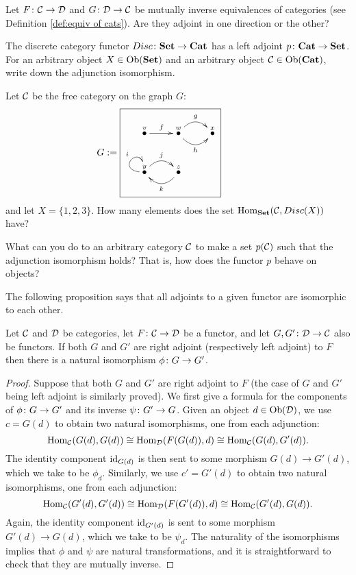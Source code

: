 \documentclass[CT4S-EN-RU]{subfiles}
\begin{document}
\begin{exercise}
Let $F\colon\mathcal{C}\rightarrow\mathcal{D}$ and $G\colon\mathcal{D}\rightarrow\mathcal{C}$ be mutually inverse equivalences of categories (see Definition \ref{def:equiv of cats}). Are they adjoint in one direction or the other?
\end{exercise}

\begin{exercise}
The discrete category functor $Disc\colon{\bf Set}\rightarrow{\bf Cat}$ has a left adjoint $p\colon{\bf Cat}\rightarrow{\bf Set}$. 
\sexc For an arbitrary object $X\in\textnormal{Ob}({\bf Set})$ and an arbitrary object $\mathcal{C}\in\textnormal{Ob}({\bf Cat})$, write down the adjunction isomorphism.
\item Let $\mathcal{C}$ be the free category on the graph $G$:
$$
G:=\parbox{2in}{\fbox{\xymatrix{\LMO{v}\ar[r]^f&\LMO{w}\ar@/_1pc/[r]_h\ar@/^1pc/[r]^g&\LMO{x}\\\LMO{y}\ar@(l,u)[]^i\ar@/^1pc/[r]^j&\LMO{z}\ar@/^1pc/[l]^k}}}
$$
and let $X=\{1,2,3\}$. How many elements does the set $\textnormal{Hom}_{\bf Set}(\mathcal{C},Disc(X))$ have?
\item What can you do to an arbitrary category $\mathcal{C}$ to make a set $p(\mathcal{C})$ such that the adjunction isomorphism holds? That is, how does the functor $p$ behave on objects?
\endsexc
\end{exercise}

The following proposition says that all adjoints to a given functor are isomorphic to each other. 

\begin{proposition}\label{prop:unicity of adjoints}

Let $\mathcal{C}$ and $\mathcal{D}$ be categories, let $F\colon\mathcal{C}\rightarrow\mathcal{D}$ be a functor, and let $G,G'\colon\mathcal{D}\rightarrow\mathcal{C}$ also be functors. If both $G$ and $G'$ are right adjoint (respectively left adjoint) to $F$ then there is a natural isomorphism $\phi\colon G\rightarrow G'$.

\end{proposition}

\begin{proof}

Suppose that both $G$ and $G'$ are right adjoint to $F$ (the case of $G$ and $G'$ being left adjoint is similarly proved). We first give a formula for the components of $\phi\colon G\rightarrow G'$ and its inverse $\psi\colon G'\rightarrow G$. Given an object $d\in\textnormal{Ob}(\mathcal{D})$, we use $c=G(d)$ to obtain two natural isomorphisms, one from each adjunction: 
$$\textnormal{Hom}_\mathcal{C}(G(d),G(d))\cong\textnormal{Hom}_\mathcal{D}(F(G(d)),d)\cong\textnormal{Hom}_\mathcal{C}(G(d),G'(d)).$$
The identity component $\textnormal{id}_{G(d)}$ is then sent to some morphism $G(d)\to G'(d)$, which we take to be $\phi_d$. Similarly, we use $c'=G'(d)$ to obtain two natural isomorphisms, one from each adjunction:
$$\textnormal{Hom}_\mathcal{C}(G'(d),G'(d))\cong\textnormal{Hom}_\mathcal{D}(F(G'(d)),d)\cong\textnormal{Hom}_\mathcal{C}(G'(d),G(d)).$$
Again, the identity component $\textnormal{id}_{G'(d)}$ is sent to some morphism $G'(d)\to G(d)$, which we take to be $\psi_d$. The naturality of the isomorphisms implies that $\phi$ and $\psi$ are natural transformations, and it is straightforward to check that they are mutually inverse.

\end{proof}
\end{document}

